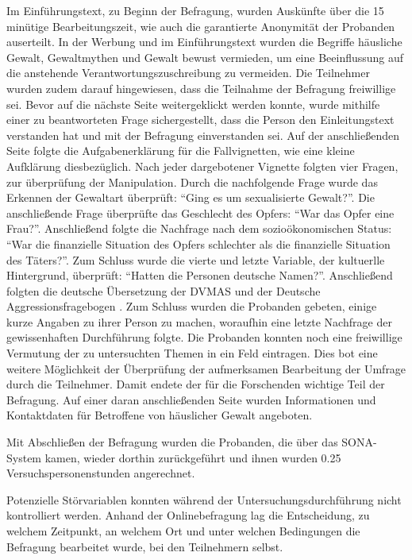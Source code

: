 Im Einführungstext, zu Beginn der Befragung, wurden Auskünfte über die 15 minütige Bearbeitungszeit, wie auch die garantierte Anonymität der Probanden auserteilt. In der Werbung und im Einführungstext wurden die Begriffe häusliche Gewalt, Gewaltmythen und Gewalt bewust vermieden, um eine Beeinflussung auf die anstehende Verantwortungszuschreibung zu vermeiden. Die Teilnehmer wurden zudem darauf hingewiesen, dass die Teilnahme der Befragung freiwillige sei. Bevor auf die nächste Seite weitergeklickt werden konnte, wurde mithilfe einer zu beantworteten Frage sichergestellt, dass die Person den Einleitungstext verstanden hat und mit der Befragung einverstanden sei. Auf der anschließenden Seite folgte die Aufgabenerklärung für die Fallvignetten, wie eine kleine Aufklärung diesbezüglich. Nach jeder dargebotener Vignette folgten vier Fragen, zur überprüfung der Manipulation. Durch die nachfolgende Frage wurde das Erkennen der Gewaltart überprüft: \enquote{Ging es um sexualisierte Gewalt?}. Die anschließende Frage überprüfte das Geschlecht des Opfers: \enquote{War das Opfer eine Frau?}. Anschließend folgte die Nachfrage nach dem sozioökonomischen Status: \enquote{War die finanzielle Situation des Opfers schlechter als die finanzielle Situation des Täters?}. Zum Schluss wurde die vierte und letzte Variable, der kultuerlle Hintergrund, überprüft: \enquote{Hatten die Personen deutsche Namen?}. Anschließend folgten die deutsche Übersetzung der DVMAS \parencite{Peters2003} und der Deutsche Aggressionsfragebogen \parencite{Aggressionsfragebogen}. Zum Schluss wurden die Probanden gebeten, einige kurze Angaben zu ihrer Person zu machen, woraufhin eine letzte Nachfrage der gewissenhaften Durchführung folgte. Die Probanden konnten noch eine freiwillige Vermutung der zu untersuchten Themen in ein Feld eintragen. Dies bot eine weitere Möglichkeit der Überprüfung der aufmerksamen Bearbeitung der Umfrage durch die Teilnehmer. Damit endete der für die Forschenden wichtige Teil der Befragung. Auf einer daran anschließenden Seite wurden Informationen und Kontaktdaten für Betroffene von häuslicher Gewalt angeboten. 

Mit Abschließen der Befragung wurden die Probanden, die über das SONA-System kamen, wieder dorthin zurückgeführt und ihnen wurden 0.25 Versuchspersonenstunden angerechnet.

Potenzielle Störvariablen konnten während der Untersuchungsdurchführung nicht kontrolliert werden. Anhand der Onlinebefragung lag die Entscheidung, zu welchem Zeitpunkt, an welchem Ort und unter welchen Bedingungen die Befragung bearbeitet wurde, bei den Teilnehmern selbst.


